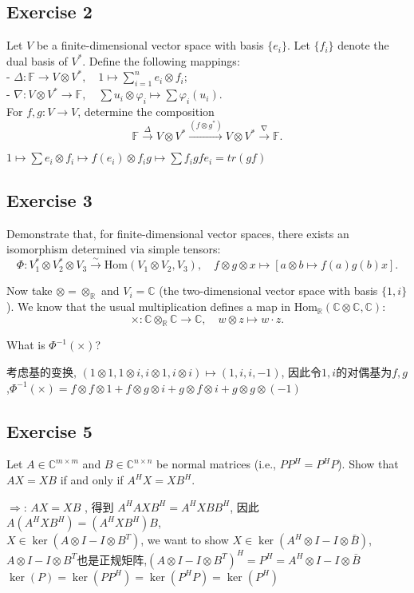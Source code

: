 \documentclass[11pt]{ctexart}
\theoremstyle{definition}
\numberwithin{equation}{section}
\theoremstyle{definition}
\theoremstyle{remark}
\begin{document}
\subsection{Exercise 2}
Let $V$ be a finite-dimensional vector space with basis $\{e_i\}$. Let $\{f_i\}$ denote the dual basis of $V^\ast$. Define the following mappings:\\

- $\Delta : \mathbb{F} \to V \otimes V^\ast, \quad 1 \mapsto \sum_{i=1}^n e_i \otimes f_i$;\\
- $\nabla : V \otimes V^\ast \to \mathbb{F},\quad \sum u_i \otimes \varphi_i \mapsto \sum \varphi_i(u_i)$.\\

For $f, g : V \to V$, determine the composition
$$
\mathbb{F} \xrightarrow{\Delta} V \otimes V^\ast \xrightarrow{(f \otimes g^\ast)} V \otimes V^\ast \xrightarrow{\nabla} \mathbb{F}.
$$
\begin{aaa}
    $1 \mapsto \sum e_i\otimes f_i\mapsto f(e_i)\otimes f_ig\mapsto \sum f_igfe_i=tr(gf)$
\end{aaa}

\subsection{Exercise 3}
Demonstrate that, for finite-dimensional vector spaces, there exists an isomorphism determined via simple tensors:
$$
\Phi: V_1^\ast \otimes V_2^\ast \otimes V_3 \xrightarrow{\sim} \mathrm{Hom}(V_1 \otimes V_2, V_3),\quad f \otimes g \otimes x \mapsto [a \otimes b \mapsto f(a)g(b)x].
$$

Now take $\otimes = \otimes_{\mathbb{R}}$ and $V_i = \mathbb{C}$ (the two-dimensional vector space with basis $\{1, i\}$). We know that the usual multiplication defines a map in $\mathrm{Hom}_{\mathbb{R}}(\mathbb{C} \otimes \mathbb{C}, \mathbb{C})$:
$$
\times : \mathbb{C} \otimes_{\mathbb{R}} \mathbb{C} \to \mathbb{C},\quad w \otimes z \mapsto w \cdot z.
$$

What is $\Phi^{-1}(\times)$?
\begin{aaa}
    考虑基的变换, $(1\otimes 1, 1\otimes i, i\otimes 1, i\otimes i)\mapsto (1,i,i,-1)$, 因此令$1,i$的对偶基为$f,g$,$\Phi^{-1}(\times)=f\otimes f\otimes 1 +f\otimes g\otimes i + g\otimes f \otimes i + g\otimes g\otimes (-1)$
\end{aaa}

\subsection{Exercise 5}
Let $A \in \mathbb{C}^{m \times m}$ and $B \in \mathbb{C}^{n \times n}$ be normal matrices (i.e., $PP^H = P^HP$). Show that $AX = XB$ if and only if $A^H X = X B^H$.
\begin{aaa}
    $\Rightarrow$: $AX=XB$ , 得到 $A^HAXB^H=A^HXBB^H$, 因此 $A(A^HXB^H)=(A^HXB^H)B$, \\
    $X\in \ker(A\otimes I-I\otimes B^T)$, we want to show $X\in \ker(A^H\otimes I - I \otimes \bar{B})$, \\
    $A\otimes I-I\otimes B^T$也是正规矩阵,$(A\otimes I-I\otimes B^T)^H=P^H=A^H\otimes I - I \otimes \bar{B}$\\$\ker (P)=\ker (PP^H) = \ker (P^HP) =\ker (P^H)$
\end{aaa}
\end{document}
